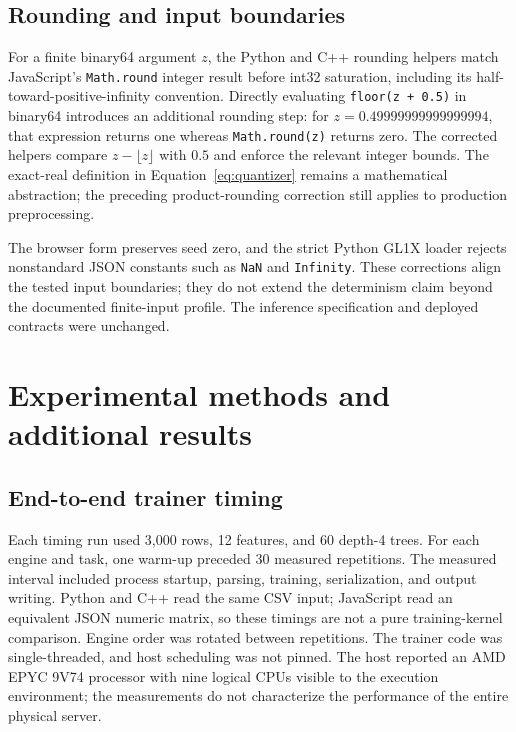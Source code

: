\documentclass[10pt,a4paper]{article}
\theoremstyle{remark}
\begin{document}
\subsection{Rounding and input boundaries}

For a finite binary64 argument $z$, the Python and C++ rounding helpers match
JavaScript's \texttt{Math.round} integer result before int32 saturation,
including its half-toward-positive-infinity convention. Directly evaluating
\texttt{floor(z + 0.5)} in binary64 introduces an additional rounding step:
for $z=0.49999999999999994$, that expression returns one whereas
\texttt{Math.round(z)} returns zero. The corrected helpers compare
$z-\lfloor z\rfloor$ with $0.5$ and enforce the relevant integer bounds.
The exact-real definition in Equation~\ref{eq:quantizer} remains a
mathematical abstraction; the preceding product-rounding correction still
applies to production preprocessing.

The browser form preserves seed zero, and the strict Python GL1X loader
rejects nonstandard JSON constants such as \texttt{NaN} and
\texttt{Infinity}. These corrections align the tested input boundaries; they
do not extend the determinism claim beyond the documented finite-input
profile. The inference specification and deployed contracts were unchanged.

\section{Experimental methods and additional results}
\label{sec:supp-experiments}

\subsection{End-to-end trainer timing}
\label{sec:supp-timing}

Each timing run used 3,000 rows, 12 features, and 60 depth-4 trees. For each
engine and task, one warm-up preceded 30 measured repetitions. The measured
interval included process startup, parsing, training, serialization, and
output writing. Python and C++ read the same CSV input; JavaScript read an
equivalent JSON numeric matrix, so these timings are not a pure training-kernel
comparison. Engine order was rotated between repetitions. The trainer code
was single-threaded, and host scheduling was not pinned. The host reported
an AMD EPYC 9V74 processor with nine
logical CPUs visible to the execution environment; the measurements do not
characterize the performance of the entire physical server.
\end{document}
